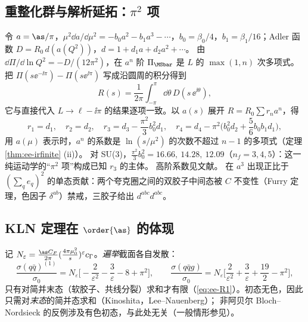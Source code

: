 \subsection{重整化群与解析延拓：\texorpdfstring{$\pi^2$}{pi^2} 项}\label{sec:ee-rg}

令 $a=\as/\pi$，$\mu^2\dd a/\dd\mu^2=-b_0a^2-b_1a^3-\cdots$，$b_0=\beta_0/4$，$b_1=\beta_1/16$；Adler 函数 $D=R_0\,d(a(Q^2))$，$d=1+d_1a+d_2a^2+\cdots$。
由 $\dd\Pi/\dd\ln Q^2=-D/(12\pi^2)$，在 $a^n$ 阶 $\Pi_{\MSbar}$ 是 $L$ 的 $\max(1,n)$ 次多项式。把 $\Pi(s\ee^{-\ii\pi})-\Pi(s\ee^{\ii\pi})$ 写成沿圆周的积分得到
\begin{equation}\label{eq:ee-contour}
R(s)=\frac{1}{2\pi}\int_{-\pi}^{\pi}\dd\theta\,D(s\,\ee^{\ii\theta}),
\end{equation}
它与直接代入 $L\to\ell-\ii\pi$ 的结果逐项一致。以 $a(s)$ 展开 $R=R_0\sum r_na^n$，得
\begin{equation}\label{eq:ee-pi2}
r_1=d_1,\quad r_2=d_2,\quad r_3=d_3-\frac{\pi^2}{3}b_0^2d_1,\quad r_4=d_4-\pi^2\Big(b_0^2d_2+\frac56b_0b_1d_1\Big),
\end{equation}
用 $a(\mu)$ 表示时，$a^n$ 的系数是 $\ln(s/\mu^2)$ 的次数不超过 $n-1$ 的多项式（定理 \ref{thm:ee-irfinite} (ii)）。
对 SU(3)，$\frac{\pi^2}{3}b_0^2=16.66,\ 14.28,\ 12.09$（$n_f=3,4,5$）：这一纯运动学的“$\pi^2$ 项”构成已知 $r_3$ 的主体\cite{KrasnikovPivovarov1982,Radyushkin1996,KataevStarshenko1995}。
高阶系数见文献\cite{ChetyrkinKataevTkachov1979,DineSapirstein1979,CelmasterGonsalves1980a,CelmasterGonsalves1980b,GorishniiKataevLarin1991,SurguladzeSamuel1991,BaikovChetyrkinKuhn2008}。
在 $a^3$ 出现正比于 $(\sum_qe_q)^2$ 的单态贡献：两个夸克圈之间的双胶子中间态被 $C$ 不变性（Furry 定理，色因子 $\delta^{ab}$）禁戒，三胶子给出 $d^{abc}d^{abc}$。

\subsection{KLN 定理在 \texorpdfstring{$\order{\as}$}{O(alpha_s)} 的体现}\label{sec:ee-kln}

记 $N_\varepsilon=\frac{\as C_F}{2\pi}(\frac{4\pi\mu_0^2}{s})^{\varepsilon}c_\Gamma$。\emph{遍举}截面各自发散：
\begin{equation}\label{eq:ee-excl}
\frac{\sigma(q\bar q)^{(1)}}{\sigma_0}=N_\varepsilon\Big[-\frac{2}{\varepsilon^2}-\frac{3}{\varepsilon}-8+\pi^2\Big],\qquad
\frac{\sigma(q\bar qg)}{\sigma_0}=N_\varepsilon\Big[\frac{2}{\varepsilon^2}+\frac{3}{\varepsilon}+\frac{19}{2}-\pi^2\Big],
\end{equation}
只有对简并末态（软胶子、共线分裂）求和才有限（\cref{eq:ee-R1}）。初态无色，因此只需对\emph{末态}的简并态求和（Kinoshita\cite{Kinoshita1962}，Lee--Nauenberg\cite{LeeNauenberg1964}）；
非阿贝尔 Bloch--Nordsieck 的反例\cite{DoriaFrenkelTaylor1980,DiLietoEtAl1981}涉及有色初态，与此处无关（一般情形参见\cite{FryeEtAl2019}）。


